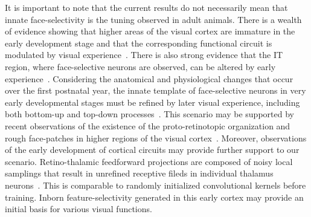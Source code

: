 \documentclass[final,3p,times,twocolumn]{elsarticle}
\begin{document}
It is important to note that the current results do not necessarily mean that innate face-selectivity is the tuning observed in adult animals.
There is a wealth of evidence showing that higher areas of the visual cortex are immature in the early development stage and that the corresponding functional circuit is modulated by visual experience~\cite{zhang2005delayed,baldwin2012cortical,bourne2006hierarchical,kiorpes2004neural}.
There is also strong evidence that the IT region, where face-selective neurons are observed, can be altered by early experience~\cite{srihasam2012behavioral,srihasam2014novel}.
Considering the anatomical and physiological changes that occur over the first postnatal year, 
the innate template of face-selective neurons in very early developmental stages must be refined by later visual experience, including both bottom-up and top-down processes~\cite{yan2018bottom,epshtein2008image}.
This scenario may be supported by recent observations of the existence of the proto-retinotopic organization and rough face-patches in higher regions of the visual cortex~\cite{livingstone2017development,srihasam2014novel,arcaro2017hierarchical}.
Moreover, observations of the early development of cortical circuits may provide further support to our scenario.
Retino-thalamic feedforward projections are composed of noisy local samplings that result in unrefined receptive fileds in individual thalamus neurons~\cite{tavazoie2000diverse}.
This is comparable to randomly initialized convolutional kernels before training.
Inborn feature-selectivity generated in this early cortex may provide an initial basis for various visual functions.
\end{document}
